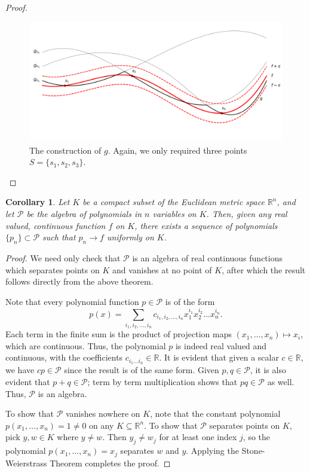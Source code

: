 \documentclass[11pt]{article}
\def\R{\mathbb{R}}
\newtheorem{corollary}{Corollary}[theorem]
\theoremstyle{definition}
\theoremstyle{remark}
\begin{document}
\begin{proof}
        \begin{figure}[H]
            \centering
            \includegraphics[width=1.0\textwidth]{./img/weierstrass_B_4.png}
            \caption{The construction of $g$. Again, we only required three points
            $S = \{s_1, s_2, s_3\}$.}
            \label{fig:weierstrass_B}
        \end{figure}
    \end{proof}

    \begin{corollary}
        Let $K$ be a compact subset of the Euclidean metric space $\R^n$, and let
        $\mathscr{P}$ be the algebra of polynomials in $n$ variables on $K$. Then,
        given any real valued, continuous function $f$ on $K$, there exists a
        sequence of polynomials $\{p_n\} \subset \mathscr{P}$ such that $p_n
        \to f$ uniformly on $K$.
    \end{corollary}
    \begin{proof}
        We need only check that $\mathscr{P}$ is an algebra of real continuous
        functions which separates points on $K$ and vanishes at no point of $K$,
        after which the result follows directly from the above theorem.

        Note that every polynomial function $p \in \mathscr{P}$ is of the form \[
            p(x) = \sum_{i_1, i_2, \dots, i_n} c_{i_1,i_2, \dots, i_n}
            x_1^{i_1}x_2^{i_2}\dots x_n^{i_n}.
        \] Each term in the finite sum is the product of projection maps $(x_1,
        \dots, x_n) \mapsto x_i$, which are continuous. Thus, the polynomial $p$ is
        indeed real valued and continuous, with the coefficients $c_{i_1 \dots i_n}
        \in \R$. It is evident that given a scalar $c\in \R$, we have $cp \in
        \mathscr{P}$ since the result is of the same form. Given $p, q \in
        \mathscr{P}$, it is also evident that $p + q \in \mathscr{P}$; term by term
        multiplication shows that $pq \in \mathscr{P}$ as well. Thus, $\mathscr{P}$
        is an algebra.

        To show that $\mathscr{P}$ vanishes nowhere on $K$, note that the constant
        polynomial $p(x_1, \dots, x_n) = 1 \neq 0$ on any $K \subseteq \R^n$. To show
        that $\mathscr{P}$ separates points on $K$, pick $y, w \in K$ where $y \neq
        w$. Then $y_j \neq w_j$ for at least one index $j$, so the polynomial $p(x_1,
        \dots, x_n) = x_j$ separates $w$ and $y$. Applying the Stone-Weierstrass
        Theorem completes the proof.
    \end{proof}
\end{document}
